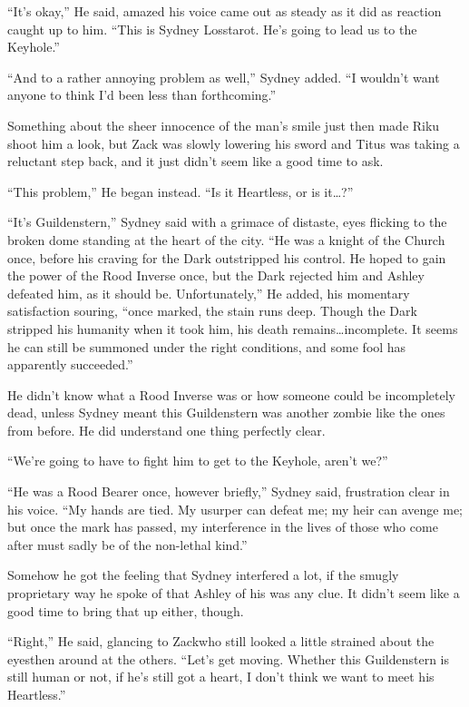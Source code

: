 ``It's okay,'' He said, amazed his voice came out as steady as it did as reaction caught up to him. ``This is Sydney Losstarot. He's going to lead us to the Keyhole.''

``And to a rather annoying problem as well,'' Sydney added. ``I wouldn't want anyone to think I'd been less than forthcoming.''

Something about the sheer innocence of the man's smile just then made Riku shoot him a look, but Zack was slowly lowering his sword and Titus was taking a reluctant step back, and it just didn't seem like a good time to ask.

``This problem,'' He began instead. ``Is it Heartless, or is it\ldots ?''

``It's Guildenstern,'' Sydney said with a grimace of distaste, eyes flicking to the broken dome standing at the heart of the city. ``He was a knight of the Church once, before his craving for the Dark outstripped his control. He hoped to gain the power of the Rood Inverse once, but the Dark rejected him and Ashley defeated him, as it should be. Unfortunately,'' He added, his momentary satisfaction souring, ``once marked, the stain runs deep. Though the Dark stripped his humanity when it took him, his death remains\ldots incomplete. It seems he can still be summoned under the right conditions, and some fool has apparently succeeded.''

He didn't know what a Rood Inverse was or how someone could be incompletely dead, unless Sydney meant this Guildenstern was another zombie like the ones from before. He did understand one thing perfectly clear.

``We're going to have to fight him to get to the Keyhole, aren't we?''

``He was a Rood Bearer once, however briefly,'' Sydney said, frustration clear in his voice. ``My hands are tied. My usurper can defeat me; my heir can avenge me; but once the mark has passed, my interference in the lives of those who come after must sadly be of the non-lethal kind.''

Somehow he got the feeling that Sydney interfered a lot, if the smugly proprietary way he spoke of that Ashley of his was any clue. It didn't seem like a good time to bring that up either, though.

``Right,'' He said, glancing to Zack\textemdash who still looked a little strained about the eyes\textemdash then around at the others. ``Let's get moving. Whether this Guildenstern is still human or not, if he's still got a heart, I don't think we want to meet his Heartless.''


